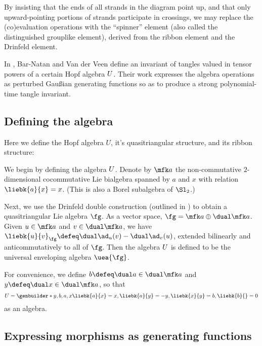 \documentclass{article}
\begin{document}
\begin{remark}
        By insisting that the ends of all strands in the diagram point up, and
        that only upward-pointing portions of strands participate in crossings,
        we may replace the (co)evaluation operations with the \enquote{spinner}
        element (also called the distinguished grouplike element), derived from
        the ribbon element and the Drinfeld element.
\end{remark}
In \cite{BV}, Bar-Natan and Van der Veen define an invariant of tangles valued
in tensor powers of a certain Hopf algebra $U$. Their work expresses the
algebra operations as perturbed Gaußian generating functions so as to produce a
strong polynomial-time tangle invariant.

\subsection{Defining the algebra}
Here we define the Hopf algebra $U$, it's quasitriangular structure, and its
ribbon structure:

We begin by defining the algebra $U$. Denote by $\fa$ the non-commutative
$2$-dimensional cocommutative Lie bialgebra spanned by $a$ and $x$ with relation
$\liebk{a}{x} = x$. (This is also a Borel subalgebra of $\Sl_2$.)

Next, we use the Drinfeld double construction (outlined in \cite{ES}) to obtain
a quasitriangular Lie algebra $\fg$. As a vector space,
$\fg = \fa \oplus \dual\fa$. Given $u \in \fa$ and $v\in \dual \fa$, we have
$\liebk{u}{v}_{\fg} \defeq \dual\ad_u(v) - \dual\ad_v(u)$, extended bilinearly
and anticommutatively to all of $\fg$.
Then the algebra $U$ is defined to be the universal enveloping algebra
$\uea{\fg}$.

\begin{remark}
        For convenience, we define $b \defeq \dual a \in \dual\fa$ and
        $y \defeq \dual x \in \dual\fa$, so that
        \begin{equation}
                U = \genbuilder*{y, b, a, x}{
                        \liebk{a}{x} = x,
                        \liebk{a}{y} = -y,
                        \liebk{x}{y} = b,
                        \liebk{b}{ } = 0
                }
        \end{equation}
        as an algebra.
\end{remark}


\subsection{Expressing morphisms as generating functions}
\end{document}
